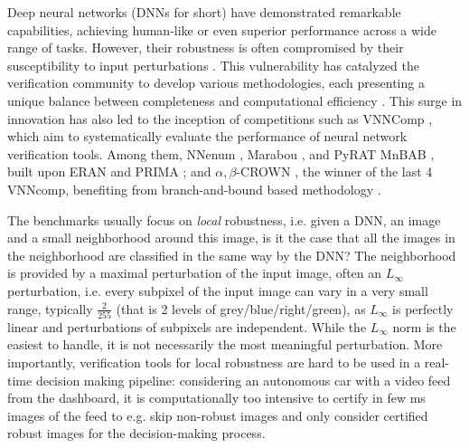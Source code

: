 Deep neural networks (DNNs for short) have demonstrated remarkable capabilities, achieving human-like or even superior performance across a wide range of tasks. However, their robustness is often compromised by their susceptibility to input perturbations \cite{szegedy}. This vulnerability has catalyzed the verification community to develop various methodologies, each presenting a unique balance between completeness and computational efficiency \cite{Marabou,Reluplex,deeppoly}. This surge in innovation has also led to the inception of competitions such as VNNComp \cite{VNNcomp}, which aim to systematically evaluate the performance of neural network verification tools. Among them, NNenum \cite{nnenum}, Marabou \cite{Marabou,Marabou2}, and PyRAT \cite{pyrat} MnBAB \cite{ferrari2022complete}, built upon ERAN \cite{deeppoly} and PRIMA \cite{prima}; and $\alpha,\beta$-CROWN \cite{crown,xu2020fast}, the winner of the last 4 VNNcomp, benefiting from branch-and-bound based methodology \cite{cutting,BaB}.

The benchmarks usually focus on {\em local} robustness, i.e. given a DNN, an image and a small neighborhood around this image, is it the case that all the images in the neighborhood are classified in the same way by the DNN? The neighborhood is provided by a maximal perturbation of the input image, often an $L_\infty$ perturbation, i.e. every subpixel of the input image can vary in a very small range, typically $\frac{2}{255}$ (that is 2 levels of grey/blue/right/green), as $L_\infty$ is perfectly linear and perturbations of subpixels are independent. While the $L_\infty$ norm is the easiest to handle, it is not necessarily the most meaningful perturbation. More importantly, verification tools for local robustness are hard to be used in a real-time decision making pipeline: considering an autonomous car with a video feed from the dashboard, it is computationally too intensive to certify in few ms images of the feed to e.g. skip non-robust images and only consider certified robust images for the decision-making process.

\smallskip

